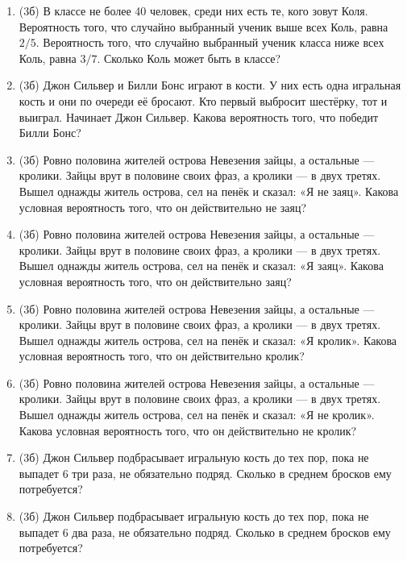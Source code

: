 \documentclass[a4paper, 12pt]{article}
\begin{document}
\newpage
\begin{enumerate}
\item (3б) В классе не более 40 человек, среди них есть те, кого зовут Коля. Вероятность того, что случайно выбранный ученик выше всех Коль, равна $2/5$. Вероятность того, что случайно выбранный ученик класса ниже всех Коль, равна $3/7$. Сколько Коль может быть в классе?
\item (3б) Джон Сильвер и Билли Бонс играют в кости. У них есть одна игральная кость и они по очереди её бросают. Кто первый выбросит шестёрку, тот и выиграл. Начинает Джон Сильвер. Какова вероятность того, что победит Билли Бонс?
\item (3б) Ровно половина жителей острова Невезения зайцы, а остальные — кролики. Зайцы врут в половине своих фраз, а кролики — в двух третях. Вышел однажды житель острова, сел на пенёк и сказал: «Я не заяц». Какова условная вероятность того, что он действительно не заяц?
\item (3б) Ровно половина жителей острова Невезения зайцы, а остальные — кролики. Зайцы врут в половине своих фраз, а кролики — в двух третях. Вышел однажды житель острова, сел на пенёк и сказал: «Я заяц». Какова условная вероятность того, что он действительно заяц?
\item (3б) Ровно половина жителей острова Невезения зайцы, а остальные — кролики. Зайцы врут в половине своих фраз, а кролики — в двух третях. Вышел однажды житель острова, сел на пенёк и сказал: «Я кролик». Какова условная вероятность того, что он действительно кролик?
\item (3б) Ровно половина жителей острова Невезения зайцы, а остальные — кролики. Зайцы врут в половине своих фраз, а кролики — в двух третях. Вышел однажды житель острова, сел на пенёк и сказал: «Я не кролик». Какова условная вероятность того, что он действительно не кролик?
\item (3б) Джон Сильвер подбрасывает игральную кость до тех пор, пока не выпадет 6 три раза, не обязательно подряд. Сколько в среднем бросков ему потребуется?
\item (3б) Джон Сильвер подбрасывает игральную кость до тех пор, пока не выпадет 6 два раза, не обязательно подряд. Сколько в среднем бросков ему потребуется?

\end{enumerate}
\end{document}
